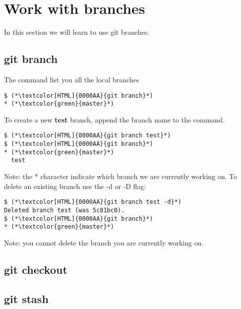 \section{Work with branches}
\begin{frame}[fragile]
    \slidetitle
In this section we will learn to use git branches.

\end{frame}

\subsection{git branch}
\begin{frame}[fragile]
    \subslidetitle
The  command list you all the local branches
\begin{lstlisting}
$ (*\textcolor[HTML]{0000AA}{git branch}*)
* (*\textcolor{green}{master}*)
\end{lstlisting}

To create a new \textbf{test} branch, append the branch name to the command.
\begin{lstlisting}
$ (*\textcolor[HTML]{0000AA}{git branch test}*)
$ (*\textcolor[HTML]{0000AA}{git branch}*)
* (*\textcolor{green}{master}*)
  test
\end{lstlisting}

Note: the * character indicate which branch we are currently working on.
\newline
To delete an existing branch use the -d or -D flag:
\begin{lstlisting}
$ (*\textcolor[HTML]{0000AA}{git branch test -d}*)
Deleted branch test (was 5c81bc0).
$ (*\textcolor[HTML]{0000AA}{git branch}*)
* (*\textcolor{green}{master}*)
\end{lstlisting}
\end{frame}

Note: you cannot delete the branch you are currently working on.

\subsection{git checkout}
\begin{frame}[fragile]
    \subslidetitle
\end{frame}

\subsection{git stash}
\begin{frame}[fragile]
    \subslidetitle
\end{frame}

